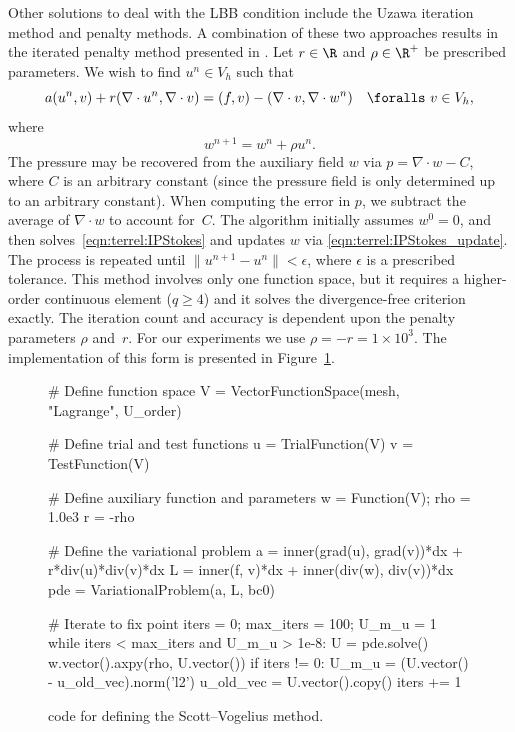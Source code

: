 Other solutions to deal with the LBB condition include the Uzawa iteration
method and penalty methods.  A combination of these two approaches results
in the iterated penalty method presented in \citet{ScottVogelius1985}. Let
$r \in \R$ and $\rho \in \R^{+}$ be prescribed parameters. We wish to
find $u^n \in V_{h}$ such that
\begin{equation}
\label{eqn:terrel:IPStokes}
 a(u^n, v) + r(\nabla \cdot u^n, \nabla \cdot v)
      =  (f, v) - (\nabla\cdot v, \nabla \cdot w^n) \quad \foralls \ v \in V_{h},
\end{equation}
%
where
%
\begin{equation}
\label{eqn:terrel:IPStokes_update}
   w^{n+1} = w^n + \rho u^n.
\end{equation}
%
The pressure may be recovered from the auxiliary field $w$ via $p =
\nabla\cdot w - C$, where $C$ is an arbitrary constant (since the
pressure field is only determined up to an arbitrary constant).
When computing the error in $p$, we subtract the average of $\nabla
\cdot w$ to account for~$C$. The algorithm initially assumes $w^0 =
0$, and then solves~\eqref{eqn:terrel:IPStokes} and updates $w$ via
\eqref{eqn:terrel:IPStokes_update}. The process is repeated until
$\|u^{n+1} - u^{n}\| < \epsilon$, where $\epsilon$ is a prescribed
tolerance. This method involves only one function space, but it
requires a higher-order continuous element ($q \ge 4$) and it solves the
divergence-free criterion exactly. The iteration count and accuracy is
dependent upon the penalty parameters $\rho$ and~$r$.  For our experiments
we use $\rho = -r = 1 \times 10^{3}$.  The implementation of this form
is presented in Figure~\ref{code:terrel:var:ip}.
%
\begin{figure}
\begin{python}
# Define function space
V = VectorFunctionSpace(mesh, "Lagrange", U_order)

# Define trial and test functions
u = TrialFunction(V)
v = TestFunction(V)

# Define auxiliary function and parameters
w = Function(V);
rho = 1.0e3
r = -rho

# Define the variational problem
a = inner(grad(u), grad(v))*dx + r*div(u)*div(v)*dx
L = inner(f, v)*dx + inner(div(w), div(v))*dx
pde = VariationalProblem(a, L, bc0)

# Iterate to fix point
iters = 0; max_iters = 100; U_m_u = 1
while iters < max_iters and U_m_u > 1e-8:
    U = pde.solve()
    w.vector().axpy(rho, U.vector())
    if iters != 0:
        U_m_u = (U.vector() - u_old_vec).norm('l2')
    u_old_vec = U.vector().copy()
    iters += 1
\end{python}
\caption{\dolfin{} code for defining the Scott--Vogelius method.}
\label{code:terrel:var:ip}
\end{figure}

